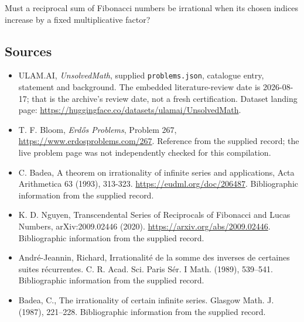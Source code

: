 \documentclass[11pt,a4paper]{article}
\begin{document}
Must a reciprocal sum of Fibonacci numbers be irrational when its chosen indices increase by a fixed multiplicative factor?

\subsection{Sources}

{\small

\begin{itemize}

\item[\hypertarget{source:statement:1}{S1}] ULAM.AI, \emph{UnsolvedMath}, supplied \texttt{problems.json}, catalogue entry, statement and background. The embedded literature-review date is 2026-08-17; that is the archive’s review date, not a fresh certification. Dataset landing page: \url{https://huggingface.co/datasets/ulamai/UnsolvedMath}.

\item[\hypertarget{source:statement:2}{S2}] T. F. Bloom, \emph{Erdős Problems}, Problem 267, \url{https://www.erdosproblems.com/267}. Reference from the supplied record; the live problem page was not independently checked for this compilation.

\item[\hypertarget{source:statement:3}{S3}] C. Badea, A theorem on irrationality of infinite series and applications, Acta Arithmetica 63 (1993), 313-323. \url{https://eudml.org/doc/206487}. Bibliographic information from the supplied record.

\item[\hypertarget{source:statement:4}{S4}] K. D. Nguyen, Transcendental Series of Reciprocals of Fibonacci and Lucas Numbers, arXiv:2009.02446 (2020). \url{https://arxiv.org/abs/2009.02446}. Bibliographic information from the supplied record.

\item[\hypertarget{source:statement:5}{S5}] Andr\'{e}-Jeannin, Richard, Irrationalit\'{e}{} de la somme des inverses de certaines suites r\'{e}currentes. C. R. Acad. Sci. Paris S\'{e}r. I Math. (1989), 539--541. Bibliographic information from the supplied record.

\item[\hypertarget{source:statement:6}{S6}] Badea, C., The irrationality of certain infinite series. Glasgow Math. J. (1987), 221--228. Bibliographic information from the supplied record.

\end{itemize}

}

\label{end:statement}
\end{document}
